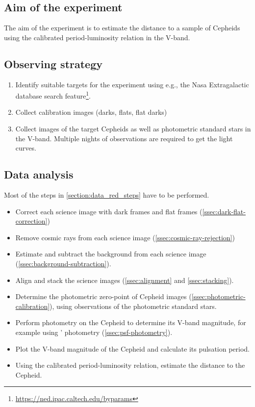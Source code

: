 \documentclass[a4paper, 11pt, fleqn]{memoir}
\begin{document}
\subsection{Aim of the experiment}

The aim of the experiment is to estimate the distance to a sample of Cepheids using the calibrated period-luminosity relation in the V-band.

\subsection{Observing strategy}

\begin{enumerate}
    \item Identify suitable targets for the experiment using e.g., the Nasa Extragalactic database search feature\footnote{\url{https://ned.ipac.caltech.edu/byparams}}.
    \item Collect calibration images (darks, flats, flat darks)
    \item Collect images of the target Cepheids as well as photometric standard stars in the V-band. Multiple nights of observations are required to get the light curves.
\end{enumerate}


\subsection{Data analysis}

Most of the steps in \cref{section:data_red_steps} have to be performed.

\begin{itemize}
    \item Correct each science image with dark frames and flat frames (\cref{ssec:dark-flat-correction})
    \item Remove cosmic rays from each science image (\cref{ssec:cosmic-ray-rejection})
    \item Estimate and subtract the background from each science image (\cref{ssec:background-subtraction}).
    \item Align and stack the science images (\cref{ssec:alignment} and \cref{ssec:stacking}).
    \item Determine the photometric zero-point of Cepheid images (\cref{ssec:photometric-calibration}), using observations of the photometric standard stars.
    \item Perform photometry on the Cepheid to determine its V-band magnitude, for example using '  photometry (\cref{ssec:psf-photometry}).
    \item Plot the V-band magnitude of the Cepheid and calculate its pulsation period.
    \item Using the calibrated period-luminosity relation, estimate the distance to the Cepheid.
\end{itemize}
\end{document}
